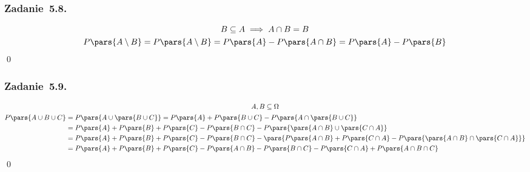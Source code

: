 \subsubsection*{Zadanie~5.8.}
\begin{gather*}
    B \subseteq A \implies A \cap B = B\\
    P\pars{A \setminus B}
        = P\pars{A \setminus B}
        = P\pars{A} - P\pars{A \cap B}
        = P\pars{A} - P\pars{B}
\end{gather*}
\qed
\subsubsection*{Zadanie~5.9.}
\begin{gather*}
    A, B \subseteq \Omega\\
    \begin{split}
        P\pars{A \cup B \cup C}
            &= P\pars{A \cup \pars{B \cup C}}
            = P\pars{A} + P\pars{B \cup C} - P\pars{A \cap \pars{B \cup C}}\\
            &= P\pars{A} + P\pars{B} + P\pars{C} - P\pars{B \cap C} - P\pars{\pars{A \cap B} \cup \pars{C \cap A}}\\
            &= P\pars{A} + P\pars{B} + P\pars{C} - P\pars{B \cap C} - \pars{P\pars{A \cap B} + P\pars{C \cap A} - P\pars{\pars{A \cap B} \cap \pars{C \cap A}}}\\
            &= P\pars{A} + P\pars{B} + P\pars{C} - P\pars{A \cap B} - P\pars{B \cap C} - P\pars{C \cap A} + P\pars{A \cap B \cap C}
    \end{split}
\end{gather*}
\qed
